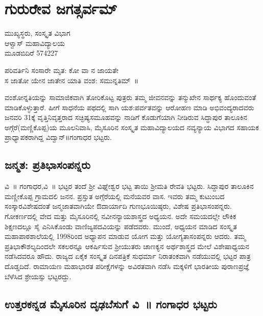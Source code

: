 {\fontsize{14}{16}\selectfont
\chapter{ಗುರುರೇವ ಜಗತ್ಸರ್ವಮ್}

\begin{center}
\smallskip
ಮುಖ್ಯಸ್ಥರು, ಸಂಸ್ಕೃತ ವಿಭಾಗ \\
ಆಳ್ವಾಸ್ ಮಹಾವಿದ್ಯಾಲಯ\\
ಮೂಡಬಿದಿರೆ  \enginline{-}  574227
\addrule
\end{center}
\begin{center}
ಪರಿವರ್ತಿನಿ ಸಂಸಾರೇ ಮೃತ: ಕೋ ವಾ ನ ಜಾಯತೇ\\
ಸ ಜಾತೋ ಯೇನ ಜಾತೇನ ಯಾತಿ ವಂಶ: ಸಮುನ್ನತಿಮ್~॥
\end{center}
ವಂಶೋನ್ನತಿಯನ್ನು ಸಾಮಾಜಿಕವಾಗಿ ತೋರಿಕೊಟ್ಟ ಪುತ್ರರು ತಮ್ಮ ಜೀವನವನ್ನು ತನ್ಮುಖೇನ ಸಾರ್ಥಕ್ಯ ಹೊಂದುವಂತೆ ಮಾಡಿಕೊಳ್ಳುತ್ತಾರೆ. ಹೀಗೆ ಸಾಧನೆಯ ಪಥದಲ್ಲಿ ಸಾಗಿ ಯಶ:ಪರ್ವತವನ್ನು ಆರೋಹಣ ಮಾಡಿ ಅಭಿವಂದ್ಯರಾದವರು ಜನವರಿ 31ಕ್ಕೆ ವೃತ್ತಿನಿವೃತ್ತರಾದ ಸಚ್ಛಿಷ್ಯಸಮೂಹವನ್ನು ನಾಡಿಗೆ ಕೊಡುಗೆಯಾಗಿ ನೀಡಿರುವ ಸಿದ್ಧಾಪುರ ತಾಲೂಕಿನ ಅಗ್ಗೆರೆ(ಮಣ್ಣಿಕೊಪ್ಪ)ಯ ಮೂಲನಿವಾಸಿ, ಮೈಸೂರಿನ ಸಂಸ್ಕೃತ ಮಹಾವಿದ್ಯಾಲಯದ ನವ್ಯನ್ಯಾಯ ವಿಭಾಗದ ಸಹಾಯಕ ಪ್ರಾಧ್ಯಾಪಕರಾಗಿದ್ದ ವಿದ್ವಾನ್॥ಗಂಗಾಧರ ಭಟ್ಟರು.

\section*{ಜನ್ಮತ: ಪ್ರತಿಭಾಸಂಪನ್ನರು}

ವಿ~॥ ಗಂಗಾಧರ,ವಿ~॥ ಭಟ್ಟರ ತಂದೆ ಶ್ರೀ ವಿಘ್ನೇಶ್ವರ ಭಟ್ಟ ತಾಯಿ ಶ್ರೀಮತಿ ರೇವತಿ ಭಟ್ಟರು. ಸಿದ್ದಾಪುರ ತಾಲೂಕಿನ ಮಣ್ಣೀಕೊಪ್ಪ ಗ್ರಾಮದಲಿ ಜನನ. ಪ್ರಸ್ತುತ ಅಗ್ಗೆರೆಯಲ್ಲಿ ಮನೆಯವರ ವಾಸ. ಇವರು ತಮ್ಮ ಕುಟುಂಬದ ಸಂಸ್ಕಾರವಿಶೇಷದಂತೆ ಜನ್ಮಜಾತವಾಗಿಯೇ ಔದಾರ್ಯಾದಿ ಗುಣಭೂಯಿಷ್ಠರು, ವಿಶೇಷ ಪ್ರತಿಭಾಸಂಪನ್ನರು. ಗೋಕರ್ಣದಲ್ಲಿ ವೇದ ಮತ್ತು ಮೈಸೂರಿನಲ್ಲಿ ನವೀನನ್ಯಾಯಶಾಸ್ತ್ರದ ಅಧ್ಯಯನ. ಅದೇ ಸಮಯದಲ್ಲೇ ಲೌಕಿಕ ಶಿಕ್ಷಣದಲ್ಲೂ ಸೈ ಎನಿಸಿಕೊಂಡು ವಾಣಿಜ್ಯಪದವಿಯನ್ನು ಪಡೆದವರು.  ಮುಂದೆ, ಅಧ್ಯಯನ ಮಾಡಿದ ಸಂಸ್ಕೃತ ಮಹಾಪಾಠಶಾಲೆಯಲ್ಲಿ 1998ರಿಂದ ಅಧ್ಯಾಪನ ಮಾಡುವ ಯೋಗ ಮತ್ತು ಯೋಗ್ಯತಾಸಂಪನ್ನರು ಆದರು. ತಮ್ಮ ಪ್ರತಿಭಾಕೌಶಲ್ಯದಿಂದಲೇ ಸಕಲರನ್ನೂ ಆಕರ್ಷಿಸುವ ಶ್ರೀಯುತರು ಚಾಣಕ್ಯನ ಅರ್ಥಶಾಸ್ತ್ರದ ಮೇಲೆ ವಿಶೇಷಾಧ್ಯಯನ ನಡೆಸಿದವರೂ ಹೌದು. ರಾಜ್ಯದ ಏಕೈಕ ಸಂಸ್ಕೃತ ದಿನಪತ್ರಿಕೆ ಸುಧರ್ಮಾ ನಿರಾತಂಕವಾಗಿ ನಡೆಯುವಲ್ಲಿ ಭಟ್ಟರ ಪಾತ್ರ ದೊಡ್ಡದಿದೆ. ರಾಮಾಯಣ  \enginline{-}  ಮಹಾಭಾರತ ಪರೀಕ್ಷೆಗಳನ್ನು ಅವಿರತವಾಗಿ ನಡೆಸಿ ಮಕ್ಕಳಿಗೆ ಭಾರತೀಯ ಪುರಾಣಪ್ರಜ್ಞೆ ಬೆಳೆಸಿದ ಶ್ರೇಯಸ್ಸು ಭಟ್ಟರದ್ದು.

\section*{ಉತ್ತರಕನ್ನಡ  \enginline{-}  ಮೈಸೂರಿನ ದೃಢಬೆಸುಗೆ   \enginline{-}   ವಿ~॥ ಗಂಗಾಧರ ಭಟ್ಟರು}

}
